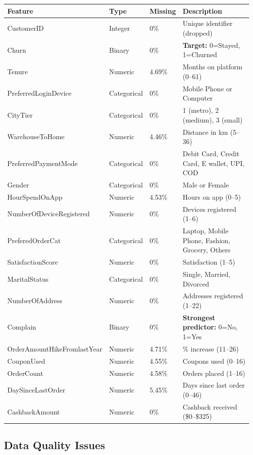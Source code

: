 \documentclass[11pt,a4paper]{article}
\begin{document}
\begin{longtable}{p{4cm}p{1.8cm}p{1.3cm}p{6.5cm}}
\toprule
\textbf{Feature} & \textbf{Type} & \textbf{Missing} & \textbf{Description} \\
\midrule
\endhead
CustomerID & Integer & 0\% & Unique identifier (dropped) \\
\rowcolor{accentlight}
Churn & Binary & 0\% & \textbf{Target:} 0=Stayed, 1=Churned \\
Tenure & Numeric & 4.69\% & Months on platform (0--61) \\
PreferredLoginDevice & Categorical & 0\% & Mobile Phone or Computer \\
CityTier & Categorical & 0\% & 1 (metro), 2 (medium), 3 (small) \\
WarehouseToHome & Numeric & 4.46\% & Distance in km (5--36) \\
PreferredPaymentMode & Categorical & 0\% & Debit Card, Credit Card, E wallet, UPI, COD \\
Gender & Categorical & 0\% & Male or Female \\
HourSpendOnApp & Numeric & 4.53\% & Hours on app (0--5) \\
NumberOfDeviceRegistered & Numeric & 0\% & Devices registered (1--6) \\
PreferedOrderCat & Categorical & 0\% & Laptop, Mobile Phone, Fashion, Grocery, Others \\
SatisfactionScore & Numeric & 0\% & Satisfaction (1--5) \\
MaritalStatus & Categorical & 0\% & Single, Married, Divorced \\
NumberOfAddress & Numeric & 0\% & Addresses registered (1--22) \\
\rowcolor{accentlight}
Complain & Binary & 0\% & \textbf{Strongest predictor:} 0=No, 1=Yes \\
OrderAmountHikeFromlastYear & Numeric & 4.71\% & \% increase (11--26) \\
CouponUsed & Numeric & 4.55\% & Coupons used (0--16) \\
OrderCount & Numeric & 4.58\% & Orders placed (1--16) \\
DaySinceLastOrder & Numeric & 5.45\% & Days since last order (0--46) \\
CashbackAmount & Numeric & 0\% & Cashback received (\$0--\$325) \\
\bottomrule
\end{longtable}

\subsection{Data Quality Issues}
\end{document}
